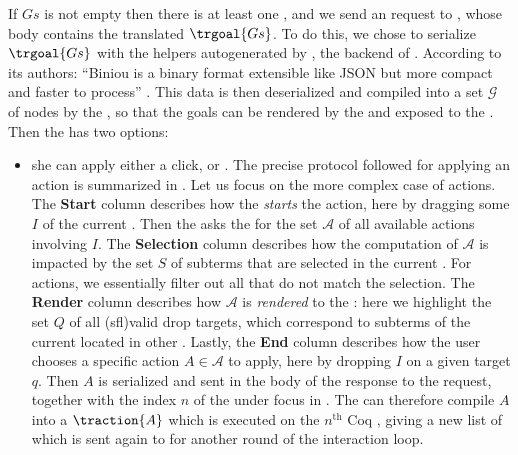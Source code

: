 \AP
If $Gs$ is not empty then there is at least one , and we send an
  request to , whose body contains the
translated  $\trgoal{Gs}$. To do this, we chose to serialize
$\trgoal{Gs}$ with the  helpers autogenerated by ,
the  backend of . According to its authors: ``Biniou is a
binary format extensible like JSON but more compact and faster to process''
\cite{atdgen}. This data is then deserialized and compiled into a set
$\mathcal{G}$ of   nodes by the , so that
the goals can be rendered by the  and exposed to the
. Then the  has two options:
\begin{itemize}
  \item she can apply either a click,  or . The precise protocol followed for
  applying an action is summarized in . Let us focus on
  the more complex case of  actions. The \textbf{Start} column describes
  how the  \emph{starts} the action, here by dragging some
   $I$ of the current . Then the  asks
  the  for the set $\mathcal{A}$ of all available 
  actions involving $I$. The \textbf{Selection} column describes how the
  computation of $\mathcal{A}$ is impacted by the set $S$ of subterms that are
  selected in the current . For  actions, we essentially
  filter out all  that do not match the selection. The
  \textbf{Render} column describes how $\mathcal{A}$ is \emph{rendered} to the
  : here we highlight the set $Q$ of all \kl(sfl){valid} drop
  targets, which correspond to subterms of the current  located in
  other . Lastly, the \textbf{End}
  column describes how the user chooses a specific action $A \in \mathcal{A}$ to
  apply, here by dropping $I$ on a given target $q$. Then $A$ is serialized and
  sent in the body of the response to the  request, together
  with the index $n$ of the  under focus in . The
   can therefore compile $A$ into a  $\traction{A}$
  which is executed on the $n^{\text{th}}$ Coq , giving a new list
  of  which is sent again to  for another round of the
  interaction loop.


\end{itemize}

